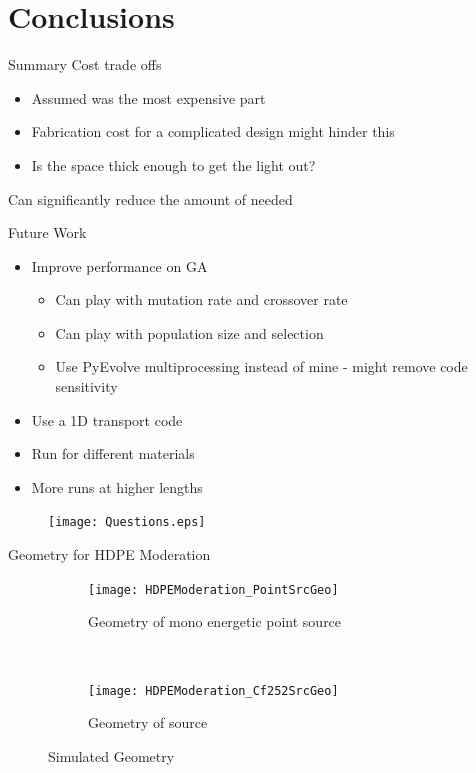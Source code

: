 \documentclass[compress]{beamer}
\begin{document}
\section{Conclusions}
\begin{frame}{Summary}
Cost trade offs
\begin{itemize}
	\item Assumed  was the most expensive part
	\item Fabrication cost for a complicated design might hinder this
	\item Is the space thick enough to get the light out?
\end{itemize}
Can significantly reduce the amount of  needed
\end{frame}
\begin{frame}{Future Work}
\begin{itemize}
	\item Improve performance on GA
	\small
	\begin{itemize}
		\item Can play with mutation rate and crossover rate
		\item Can play with population size and selection
		\item Use PyEvolve multiprocessing instead of mine - might remove code sensitivity
	\end{itemize}
	\normalsize
	\item Use a 1D transport code
	\item Run for different materials
	\item More runs at higher lengths
\end{itemize}
\end{frame}
\begin{frame}
	\centering
\begin{figure}
  \texttt{[image: Questions.eps]}
\end{figure}
\end{frame}
%  

\begin{frame}{Geometry for HDPE Moderation}
\begin{figure}
  \begin{subfigure}[b]{0.45\textwidth}
    \centering
    \texttt{[image: HDPEModeration\_PointSrcGeo]}
    \caption{Geometry of mono energetic point source}
  \end{subfigure}%
  ~
  \begin{subfigure}[b]{0.45\textwidth}
    \centering
    \texttt{[image: HDPEModeration\_Cf252SrcGeo]}
    \caption{Geometry of  source}
  \end{subfigure}
  \caption{Simulated Geometry}
\end{figure}
\end{frame}
\end{document}
